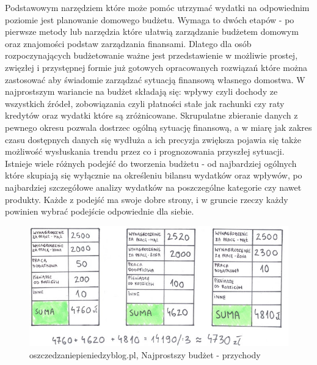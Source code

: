 \documentclass[a4paper,10pt, twoside]{report}
\begin{document}
{Podstawowym narzędziem które może pomóc utrzymać wydatki na odpowiednim 
poziomie jest planowanie domowego budżetu. Wymaga to dwóch etapów - po pierwsze 
metody lub narzędzia które ułatwią zarządzanie budżetem domowym oraz znajomości 
podstaw zarządzania finansami. Dlatego dla osób rozpoczynających budżetowanie 
ważne jest przedstawienie w możliwie prostej, zwięzłej i przystępnej formie już 
gotowych opracowanych rozwiązań które można zastosować aby świadomie zarządzać 
sytuacją finansową własnego domostwa. W najprostszym wariancie na 
budżet\cite{o24_budzetowanie}\cite{budget}\cite{mintbudget} składają się: 
wpływy czyli dochody ze wszystkich źródeł, zobowiązania czyli płatności stałe 
jak rachunki czy raty kredytów oraz wydatki które są zróżnicowane. Skrupulatne 
zbieranie danych z pewnego okresu pozwala dostrzec ogólną sytuację finansową, a 
w miarę jak zakres czasu dostępnych danych się wydłuża a ich precyzja zwiększa 
pojawia się także możliwość wysłuskania trendu przez co i prognozowania 
przyszłej sytuacji. Istnieje wiele różnych podejść do tworzenia budżetu - od 
najbardziej ogólnych które skupiają się wyłącznie na określeniu bilansu wydatków
 oraz wpływów, po najbardziej szczegółowe analizy wydatków na poszczególne 
kategorie czy nawet produkty. Każde z podejść ma swoje dobre strony, i w gruncie
 rzeczy każdy powinien wybrać podejście odpowiednie dla siebie.}


\begin{figure}[H]           %
    \caption{oszczedzaniepieniedzyblog.pl, Najprostszy budżet - przychody}
    \label{fig:}
    \centering  
    \includegraphics[width=12cm]{figures/oszczedzaniepieniedzyblog-pl_przychody.jpg}
\end{figure}
\end{document}
